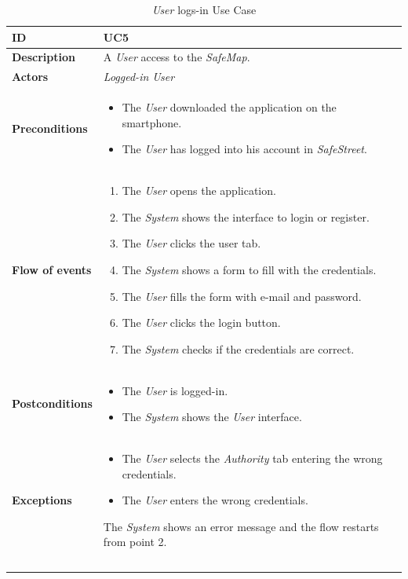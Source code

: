 \documentclass {article}
\begin{document}
	\begin{longtable}{| p{3 cm} | p{10.5 cm} |} 
			\hline
			{\bf ID} & UC5 \\
			\hline
			{\bf Description} & A {\it User} access to the {\it SafeMap}.\\
			\hline
			{\bf Actors} & {\it Logged-in User}\\
			\hline
			{\bf Preconditions} & 	
			\begin{itemize}
				\item The {\it User} downloaded the application on the smartphone.
				\item The {\it User} has logged into his account in {\it SafeStreet}.
			\end{itemize}
			\\
			\hline
			{\bf Flow of events} &	
			\begin{enumerate}
				\item The {\it User} opens the application.
				\item The {\it System} shows the interface to login or register.
				\item The {\it User} clicks the user tab.
				\item The {\it System} shows a form to fill with the credentials.
				\item The {\it User} fills the form with e-mail and password. 
				\item The {\it User} clicks the login button.
				\item The {\it System} checks if the credentials are correct. 
			\end{enumerate}
			\\
			\hline
			{\bf Postconditions} & 
			\begin{itemize}
				\item The {\it User} is logged-in.
				\item The {\it System} shows the {\it User} interface.
			\end{itemize}
			\\
			\hline
			{\bf Exceptions} & 	
			\begin{itemize}
				\item The {\it User} selects the {\it Authority} tab entering the wrong credentials. 
				\item The {\it User} enters the wrong credentials.
			\end{itemize}
			The {\it System} shows an error message and the flow restarts from point 2.
			\\ \\
			\hline
			\caption{{\it User} logs-in Use Case}
			\end{longtable}
			
\end{document}
